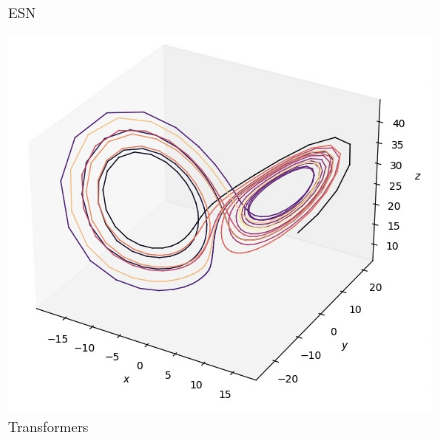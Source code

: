 \documentclass[11pt]{article}
\begin{document}
\begin{figure}[ht]
\begin{minipage}{0.32\textwidth}
        \caption{ESN}
        \label{fig:echo_lorenz}
    \end{minipage}
    \hfill
    \begin{minipage}{0.32\textwidth}
        \centering
        \includegraphics[width=\textwidth]{transformers_lorenz.jpeg}
        \caption{Transformers}
        \label{fig:transformers_lorenz}
    \end{minipage}
\end{figure}
\end{document}
